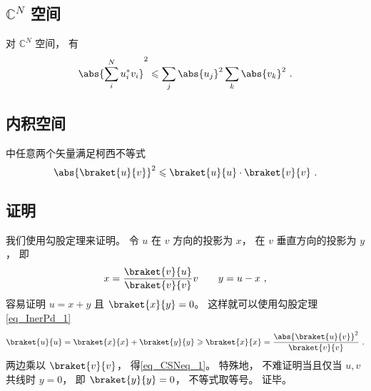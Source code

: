 
\begin{issues}
\issueDraft
\end{issues}


\subsection{$\mathbb C^N$ 空间}
对 $\mathbb C^N$ 空间， 有
\begin{equation}
\abs{\sum_i^N u_i^* v_i}^2 \leqslant \sum_j \abs{u_j}^2 \sum_k \abs{v_k}^2~.
\end{equation}

\subsection{内积空间}
中任意两个矢量满足柯西不等式
\begin{equation}\label{eq_CSNeq_1}
\abs{\braket{u}{v}}^2 \leqslant \braket{u}{u} \cdot \braket{v}{v}~.
\end{equation}

\subsection{证明}
我们使用勾股定理来证明。 令 $u$ 在 $v$ 方向的投影为 $x$， 在 $v$ 垂直方向的投影为 $y$， 即
\begin{equation}
x = \frac{\braket{v}{u}}{\braket{v}{v}} v \qquad y = u - x~,
\end{equation}
容易证明 $u = x + y$ 且 $\braket{x}{y} = 0$。 这样就可以使用勾股定理\autoref{eq_InerPd_1}~
\begin{equation}
\braket{u}{u} = \braket{x}{x} + \braket{y}{y} \geqslant \braket{x}{x} = \frac{\abs{\braket{u}{v}}^2}{\braket{v}{v}}~.
\end{equation}
两边乘以 $\braket{v}{v}$， 得\autoref{eq_CSNeq_1}。 特殊地， 不难证明当且仅当 $u, v$ 共线时 $y = 0$， 即 $\braket{y}{y} = 0$， 不等式取等号。 证毕。
